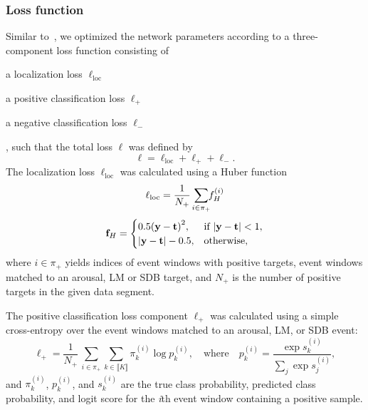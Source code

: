 \subsubsection{Loss function}
Similar to~\cite{Olesen2020DeepDetection}, we optimized the network parameters according to a three-component loss function consisting of 
\begin{enumerate*}[before=\unskip{: }, itemjoin={{; }}, itemjoin*={{, and }}, label=\roman*)]
\item a localization loss \( \ell_{\mathrm{loc}} \)
\item a positive classification loss $\ell_{+}$
\item a negative classification loss $\ell_{-}$
\end{enumerate*}, 
such that the total loss $\ell$ was defined by
\begin{equation}\label{eq:loss}
    \ell = \ell_{\mathrm{loc}} + \ell_{+} + \ell_{-}.
\end{equation}
The localization loss $\ell_{\mathrm{loc}}$ was calculated using a Huber function
\begin{equation}
    \ell_{\mathrm{loc}} = \frac{1}{N_{+}} \, \sum_{\mathclap{i \in \pi_{+}}}\!{f_{H}^{(i)}} \\
\end{equation} 
\begin{equation}
    \mathbf{f}_{H} =
    \begin{cases}
        0.5 \parentheses*{ \mathbf{y} - \mathbf{t} }^2, & \text{if } \abs*{ \mathbf{y} - \mathbf{t} } < 1, \\
        \abs*{ \mathbf{y} - \mathbf{t} } - 0.5, & \text{otherwise,}
    \end{cases}
\end{equation}
where $i \in \pi_{+}$ yields indices of event windows with positive targets, \ie event windows matched to an arousal, \ac{LM} or \ac{SDB} target, and $N_{+}$ is the number of positive targets in the given data segment.

The positive classification loss component $\ell_{+}$ was calculated using a simple cross-entropy over the event windows matched to an arousal, \ac{LM}, or \ac{SDB} event:
\begin{equation}
    \ell_{+} = \frac{1}{N_{+}} \, \sum_{i \in \pi_{+}} \sum_{k \in \llbracket K \rrbracket} \pi^{(i)}_{k} \log p^{(i)}_{k}, \quad \text{where} \quad p^{(i)}_{k} = \frac{\exp{s^{(i)}_{k}}}{\sum_{j} \exp s^{(i)}_{j}},
\end{equation}
and $\pi^{(i)}_k$, $p^{(i)}_k$, and $s^{(i)}_k$ are the true class probability, predicted class probability, and logit score for the \textit{i}th event window containing a positive sample.

